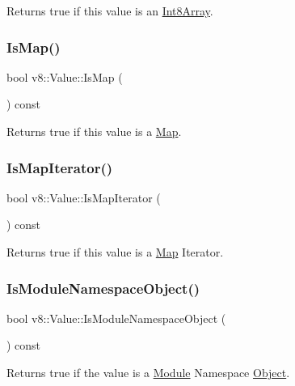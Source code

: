 Returns true if this value is an \mbox{\hyperlink{classv8_1_1Int8Array}{Int8\+Array}}. \mbox{\label{classv8_1_1Value_a85e4e8455cbd60c9b0a1dc91030383e6}} 
\subsubsection{\texorpdfstring{Is\+Map()}{IsMap()}}
{\footnotesize\ttfamily bool v8\+::\+Value\+::\+Is\+Map (\begin{DoxyParamCaption}{ }\end{DoxyParamCaption}) const}

Returns true if this value is a \mbox{\hyperlink{classv8_1_1Map}{Map}}. \mbox{\label{classv8_1_1Value_a761b2fd0aa8c2f59c879741336eb2f66}} 
\subsubsection{\texorpdfstring{Is\+Map\+Iterator()}{IsMapIterator()}}
{\footnotesize\ttfamily bool v8\+::\+Value\+::\+Is\+Map\+Iterator (\begin{DoxyParamCaption}{ }\end{DoxyParamCaption}) const}

Returns true if this value is a \mbox{\hyperlink{classv8_1_1Map}{Map}} Iterator. \mbox{\label{classv8_1_1Value_aa6c9cb065da30b0b58b929ecaa80a1ab}} 
\subsubsection{\texorpdfstring{Is\+Module\+Namespace\+Object()}{IsModuleNamespaceObject()}}
{\footnotesize\ttfamily bool v8\+::\+Value\+::\+Is\+Module\+Namespace\+Object (\begin{DoxyParamCaption}{ }\end{DoxyParamCaption}) const}

Returns true if the value is a \mbox{\hyperlink{classv8_1_1Module}{Module}} Namespace \mbox{\hyperlink{classv8_1_1Object}{Object}}. \mbox{\label{classv8_1_1Value_a1ae3d5f5823705d2b6c26378201b772b}} 
